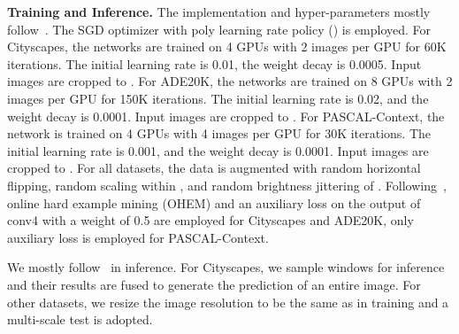 \documentclass[runningheads]{llncs}
\begin{document}
\noindent \textbf{Training and Inference.}
The implementation and hyper-parameters mostly follow~\cite{huang2019ccnet}. The SGD optimizer with poly learning rate policy () is employed.
For Cityscapes, the networks are trained on 4 GPUs with 2 images per GPU for 60K iterations. The initial learning rate is 0.01, the weight decay is 0.0005. Input images are cropped to .
For ADE20K, the networks are trained on 8 GPUs with 2 images per GPU for 150K iterations. The initial learning rate is 0.02, and the weight decay is 0.0001. Input images are cropped to .
For PASCAL-Context, the network is trained on 4 GPUs with 4 images per GPU for 30K iterations. The initial learning rate is 0.001, and the weight decay is 0.0001. Input images are cropped to .
For all datasets, the data is augmented with random horizontal flipping, random scaling within , and random brightness jittering of .
Following~\cite{yuan2018ocnet}, online hard example mining (OHEM) and an auxiliary loss on the output of conv4 with a weight of 0.5 are employed for Cityscapes and ADE20K, only auxiliary loss is employed for PASCAL-Context.

We mostly follow~\cite{huang2019ccnet} in inference. For Cityscapes, we sample  windows for inference and their results are fused to generate the prediction of an entire image. For other datasets, we resize the image resolution to be the same as in training and a multi-scale test is adopted.
\end{document}
